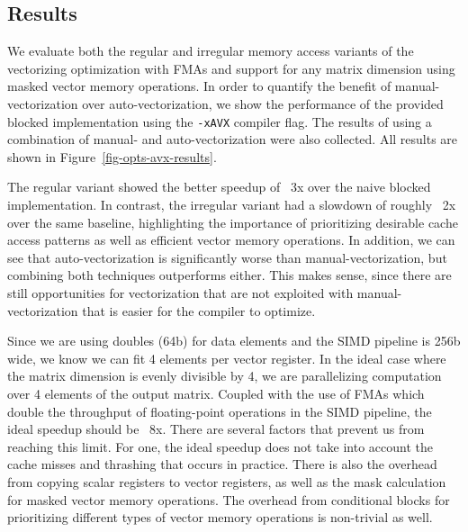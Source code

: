 \subsection{Results}


We evaluate both the regular and irregular memory access variants of the
vectorizing optimization with FMAs and support for any matrix dimension
using masked vector memory operations. In order to quantify the benefit
of manual-vectorization over auto-vectorization, we show the performance
of the provided blocked implementation using the {\tt{-xAVX}} compiler
flag. The results of using a combination of manual- and
auto-vectorization were also collected. All results are shown in
Figure~\ref{fig-opts-avx-results}.
\smallskip

The regular variant showed the better speedup of ~3x over the naive
blocked implementation. In contrast, the irregular variant had a slowdown
of roughly ~2x over the same baseline, highlighting the importance of
prioritizing desirable cache access patterns as well as efficient vector
memory operations. In addition, we can see that auto-vectorization is
significantly worse than manual-vectorization, but combining both
techniques outperforms either. This makes sense, since there are still
opportunities for vectorization that are not exploited with
manual-vectorization that is easier for the compiler to optimize.
\smallskip


Since we are using doubles (64b) for data elements and the SIMD pipeline
is 256b wide, we know we can fit 4 elements per vector register. In the
ideal case where the matrix dimension is evenly divisible by 4, we are
parallelizing computation over 4 elements of the output matrix. Coupled
with the use of FMAs which double the throughput of floating-point
operations in the SIMD pipeline, the ideal speedup should be ~8x. There
are several factors that prevent us from reaching this limit. For one,
the ideal speedup does not take into account the cache misses and
thrashing that occurs in practice. There is also the overhead from
copying scalar registers to vector registers, as well as the mask
calculation for masked vector memory operations. The overhead from
conditional blocks for prioritizing different types of vector memory
operations is non-trivial as well.

